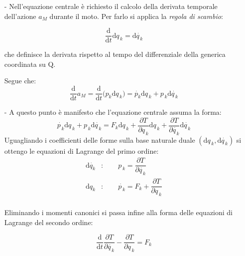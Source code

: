 \documentclass[11pt]{report}
\theoremstyle{plain}
\theoremstyle{definition}
\theoremstyle{remark}
\begin{document}
\begin{itemize}
\item[-] Nell'equazione centrale è richiesto il calcolo della derivata temporale dell'azione $a_{M}$ durante il moto. Per farlo si applica la \emph{regola di scambio}:

\begin{equation}\label{eq:regolascambio}
\dfrac{\textrm{d}}{\textrm{d}t} \textrm{d}q_{\,k} = \textrm{d}\dot{q_{\,k}}
\end{equation}

che definisce la derivata rispetto al tempo del differenziale della generica coordinata su Q.

Segue che:
\begin{displaymath}
\dfrac{\textrm{d}}{\textrm{d}t} a_{M} = \dfrac{\textrm{d}}{\textrm{d}t} \bigr( p_{k}\textrm{d}q_{\,k} \bigr) = \dot{p_{k}} \textrm{d}q_{\,k} +  p_{\,k}\textrm{d}\dot{q_{\,k}}
\end{displaymath}

\item[-] A questo punto è manifesto che l'equazione centrale assuma la forma:
\begin{displaymath}
\dot{p_{\,k}} \textrm{d} q_{\,k} + p_{\,k} \textrm{d} \dot{q_{\,k}} = F_{k} \textrm{d} q_{\,k} + \dfrac{\partial T}{\partial q_{\,k}}\textrm{d}q_{\,k} + \dfrac{\partial T}{\partial \dot{q_{\,k}}}\textrm{d}\dot{q_{\,k}}
\end{displaymath}
Uguagliando i coefficienti delle forme sulla base naturale duale $(\textrm{d} q_{\,k} , \textrm{d} \dot{q_{\,k}})$ si ottengo le equazioni di Lagrange del primo ordine:
\begin{displaymath}\begin{split}
\textrm{d} \dot{q_{k}} &: \qquad p_{\,k} = \dfrac{\partial T}{\partial \dot{q_{\,k}}}\\
\textrm{d} q_{k} &: \qquad \dot{p_{\,k}} = F_{k} + \dfrac{\partial T}{\partial q_{\,k}}\\
\end{split}\end{displaymath}

Eliminando i momenti canonici si passa infine alla forma delle equazioni di Lagrange del secondo ordine:

\begin{displaymath}
\dfrac{\textrm{d}}{\textrm{d}t} \dfrac{\partial T}{\partial \dot{q_{\,k}} } - \dfrac{\partial T}{\partial q_{\,k} } = F_{k}
\end{displaymath}

\end{itemize}
\end{document}
